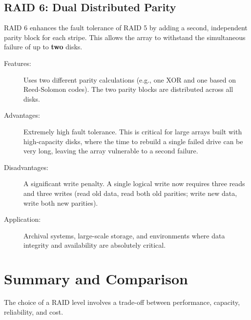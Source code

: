 \subsection{RAID 6: Dual Distributed Parity}
RAID 6 enhances the fault tolerance of RAID 5 by adding a second, independent parity block for each stripe. This allows the array to withstand the simultaneous failure of up to \textbf{two} disks.
\begin{description}
    \item[Features:] Uses two different parity calculations (e.g., one XOR and one based on Reed-Solomon codes). The two parity blocks are distributed across all disks.
    \item[Advantages:] Extremely high fault tolerance. This is critical for large arrays built with high-capacity disks, where the time to rebuild a single failed drive can be very long, leaving the array vulnerable to a second failure.
    \item[Disadvantages:] A significant write penalty. A single logical write now requires three reads and three writes (read old data, read both old parities; write new data, write both new parities).
    \item[Application:] Archival systems, large-scale storage, and environments where data integrity and availability are absolutely critical.
\end{description}

\section{Summary and Comparison}

The choice of a RAID level involves a trade-off between performance, capacity, reliability, and cost.

